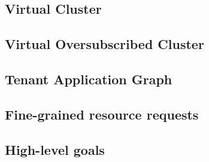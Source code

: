 

\subsection{Virtual Cluster}


\subsection{Virtual Oversubscribed Cluster} \label{voc}


\subsection{Tenant Application Graph}


\subsection{Fine-grained resource requests}


\subsection{High-level goals} \label{high-level_goals}
